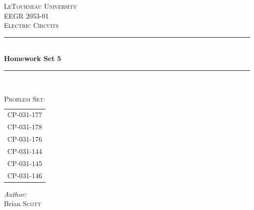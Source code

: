 \begin{titlepage}
\newcommand{\HRule}{\rule{\linewidth}{0.4mm}} %

\center %
 

\textsc{\LARGE LeTourneau University}\\[1.5cm] %
\textsc{\Large EEGR 2053-01}\\[0.5cm] %
\textsc{\large Electric Circuits}\\[0.5cm] %


\HRule \\[0.4cm]
{ \huge \bfseries Homework Set 5}\\[0.2cm] %
\HRule \\[1.5cm]
 

\begin{table}[h]
\large
\ttfamily
\centering
\caption*{\textsc{\large Problem Set:}}
\label{tab:probset}
\begin{tabular}{l}
CP-031-177 \\
CP-031-178 \\
CP-031-176 \\
CP-031-144 \\
CP-031-145 \\
CP-031-146 \\[1.5cm]
\end{tabular}
\end{table}


\Large \emph{Author:}\\
Brian \textsc{Scott}\\[1cm] %


\end{titlepage}
